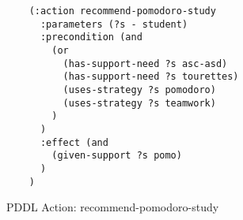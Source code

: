 \begin{figure}[t]
    \begin{lstlisting}
    (:action recommend-pomodoro-study
      :parameters (?s - student)
      :precondition (and 
        (or
          (has-support-need ?s asc-asd)
          (has-support-need ?s tourettes)
          (uses-strategy ?s pomodoro)
          (uses-strategy ?s teamwork)
        )
      )
      :effect (and 
        (given-support ?s pomo)
      )
    )
    \end{lstlisting}
    \caption{PDDL Action: recommend-pomodoro-study}\label{fig:pomo-study}
    \end{figure}